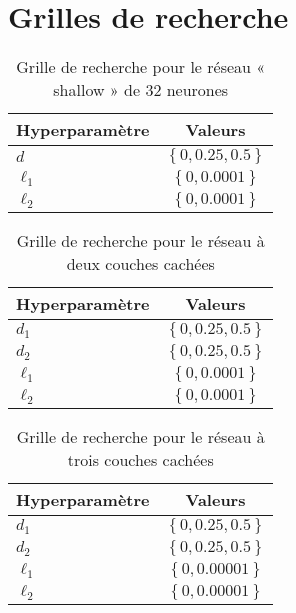 \chapter{Grilles de recherche}     %
\label{ann:grilleRecherche}                   


\begin{table}[h]
\centering
\caption{\label{tab:rechercheShallow} Grille de recherche pour le réseau « shallow » de 32 neurones}
\begin{tabular}{lc}
\toprule 
Hyperparamètre & Valeurs\\
\midrule
 $d$ & $\left\{0, 0.25, 0.5 \right\}$ \\ 
$\ell_1$  & $\left\{0 , 0.0001 \right\}$ \\ 
$\ell_2$  & $\left\{0 , 0.0001 \right\}$ \\ 
\bottomrule
 \end{tabular}  
\end{table}


\begin{table}[h]
\centering
\caption{\label{tab:rechercheDeep2} Grille de recherche pour le réseau à deux couches cachées}
\begin{tabular}{lc}
\toprule
Hyperparamètre  & Valeurs\\
\midrule
$d_1$ & $\left\{ 0, 0.25, 0.5 \right\}$\\
$d_2$ & $\left\{ 0, 0.25, 0.5 \right\}$\\
$\ell_1$ & $\left\{0, 0.0001 \right\}$\\
$\ell_2$ & $\left\{0, 0.0001 \right\}$\\
\bottomrule
\end{tabular}
\end{table}

\begin{table}[h]
\centering
\caption{\label{tab:rechercheDeep3} Grille de recherche pour le réseau à trois couches cachées}
\begin{tabular}{lc}
\toprule
Hyperparamètre  & Valeurs\\
\midrule
$d_1$ & $\left\{ 0,  0.25, 0.5 \right\}$\\
$d_2$ & $\left\{ 0, 0.25, 0.5 \right\}$\\
$\ell_1$ & $\left\{0, 0.00001 \right\}$\\
$\ell_2$ & $\left\{0, 0.00001 \right\}$\\
\bottomrule
\end{tabular}
\end{table}


